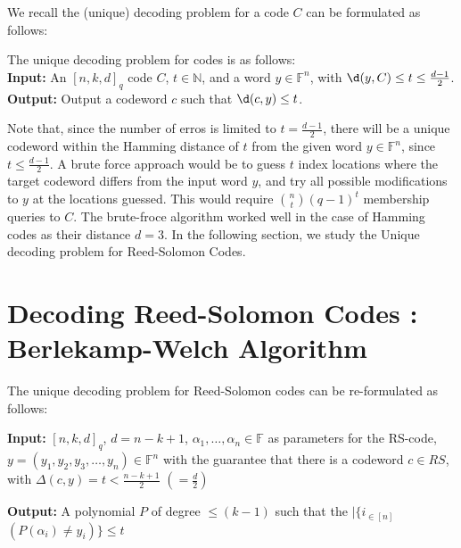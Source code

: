 We recall the (unique) decoding problem for a code $C$ 
can be formulated as follows:
\begin{problem} The unique decoding problem for codes is as follows: \\
{\bf Input:} An $[n,k,d]_q$ code $C$, $t\in {\mathbb N}$, and  a word  $y\in {\mathbb F}^n$, with $\d(y,C) \le t\le \frac{d-1}{2}$.\\
{\bf Output:} Output a codeword $c$ such that $\d(c,y)\le t$. 
\end{problem}

Note that, since the number of erros is limited to $t = \frac{d-1}{2}$, there will be  a unique codeword within the Hamming distance of $t$ from the given word $y\in {\mathbb F}^n$, since $t\le \frac{d-1}{2}$. A brute force approach would be to guess
$t$ index locations where the target codeword differs from the input word $y$, and try all possible modifications to $y$ at the locations guessed.  This would require  ${n\choose t} (q-1)^t$ membership queries to $C$.
 The brute-froce algorithm worked well in the case of Hamming codes as  their distance $d=3$.  In the following section, we study the Unique decoding problem for Reed-Solomon Codes.

\section{Decoding Reed-Solomon Codes : Berlekamp-Welch Algorithm}

The unique decoding problem for Reed-Solomon codes can be re-formulated as follows:

\noindent \textbf{Input:} $[n,k,d]_{q}$, $d=n-k+1$, ${\alpha _{1},\ldots,\alpha _{n}} \in {\mathbb F} $  as parameters for the RS-code, 
  $y = (y_{1},y_{2},y_{3},\ldots,y_{n}) \in \mathbb{F} ^{n}$ with the guarantee that there is a codeword $c\in RS$, with  $\Delta(c,y)=t<\frac{n-k+1}{2}$ $(=\frac{d}{2})$

\noindent \textbf{Output:}  A polynomial $P$ of degree $\leq (k-1)$ such that the  $|\{ i_{\in [n]}$ $ (P(\alpha_{i})\neq y_{i})\}\leq t$

